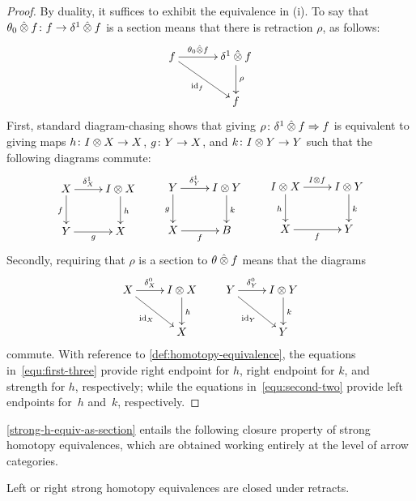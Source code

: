\documentclass[reqno,10pt,a4paper,oneside]{amsart}
\begin{document}
\begin{proof}
By duality, it suffices to exhibit the equivalence in (i). To say that $\theta_{0} \mathbin{\hat{\otimes}} f \colon f \to \delta^1 \mathbin{\hat{\otimes}} f$ is a section means that
there is retraction $\rho$, as follows:
\[
\xymatrix@C+1em{
  f
  \ar[r]^-{\thetal \hatotimes f}
  \ar[dr]_{\id_f} &   \rcyl \hatotimes f \ar[d]^{\rho} \\
&   f
}
\]
First, standard diagram-chasing shows that giving $\rho \colon \delta^1 \mathbin{\hat{\otimes}} f \Rightarrow f$ is equivalent  to giving maps $h \colon I \otimes X \to X$, $g \colon Y \to X$, and $k \colon I \otimes Y \to Y$ such that the following diagrams commute:
\begin{equation}
\label{equ:first-three}
\xycenter{
X \ar[r]^-{\rcyl_X}  \ar[d]_f & \interval \otimes X \ar[d]^{h} \\
Y \ar[r]_{g} & X}  \qquad
\xycenter{
Y \ar[r]^-{\rcyl_Y} \ar[d]_g & \interval \otimes Y \ar[d]^{k} \\
X \ar[r]_f & B} \qquad
\xycenter{ 
\interval \otimes X \ar[d]_h \ar[r]^{I \otimes f} & \interval \otimes Y \ar[d]^k \\
X \ar[r]_{f} & Y }
\end{equation}
Secondly, requiring that $\rho$ is a section to $\theta \mathbin{\hat{\otimes}} f$ means that the diagrams
\begin{equation}
\label{equ:second-two}
\xycenter{
X \ar[r]^-{\lcyl_X} \ar[dr]_{\id_X} & \interval \otimes X \ar[d]^h \\ 
 & X } \qquad
 \xycenter{
 Y \ar[r]^-{\lcyl_Y}  \ar[dr]_{\id_Y} & \interval \otimes Y \ar[d]^{k} \\
  & Y} 
\end{equation}
commute. With reference to \cref{def:homotopy-equivalence}, the equations in~\eqref{equ:first-three} provide right endpoint for $h$, 
right endpoint for $k$, and strength for $h$, respectively; while the equations in~\eqref{equ:second-two} provide left endpoints for~$h$ and~$k$, respectively.
\end{proof}

\cref{strong-h-equiv-as-section} entails the following closure property of strong homotopy equivalences, which are obtained working entirely at the level of arrow categories.


\begin{corollary}
\label{strong-h-equiv-closed-under-retract}
Left or right strong homotopy equivalences are closed under retracts.
\end{corollary}
\end{document}
